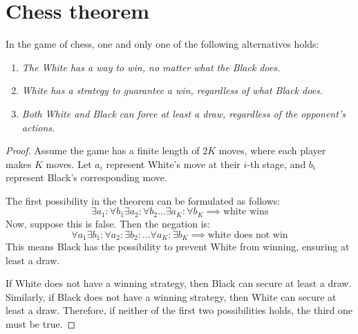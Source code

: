 \section{Chess theorem}

\begin{theorem}
    In the game of chess, one and only one of the following alternatives holds:
\end{theorem}
\begin{enumerate}
    \item \textit{The White has a way to win, no matter what the Black does.}
    \item \textit{White has a strategy to guarantee a win, regardless of what Black does.}
    \item \textit{Both White and Black can force at least a draw, regardless of the opponent's actions.}
\end{enumerate}

\begin{proof}
    Assume the game has a finite length of $2K$ moves, where each player makes $K$ moves. 
    Let $a_i$ represent White's move at their $i$-th stage, and $b_i$ represent Black's corresponding move. 

    The first possibility in the theorem can be formulated as follows:
    \[\exists a_1 : \forall b_1 \exists a_2 : \forall b_2 \dots \exists a_K : \forall b_K \implies \text{white wins}\]
    Now, suppose this is false. 
    Then the negation is:
    \[\forall a_1 \exists b_1 : \forall a_2 : \exists b_2 : \dots \forall a_K : \exists b_K \implies \text{white does not win}\]
    This means Black has the possibility to prevent White from winning, ensuring at least a draw.
    
    If White does not have a winning strategy, then Black can secure at least a draw. 
    Similarly, if Black does not have a winning strategy, then White can secure at least a draw. 
    Therefore, if neither of the first two possibilities holds, the third one must be true.
\end{proof}

